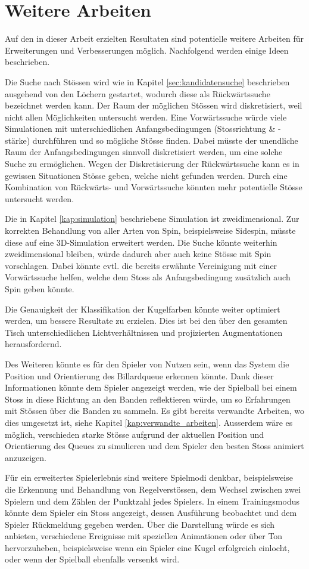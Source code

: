 \chapter{Weitere Arbeiten}
Auf den in dieser Arbeit erzielten Resultaten sind potentielle weitere Arbeiten für Erweiterungen und Verbesserungen
möglich.
Nachfolgend werden einige Ideen beschrieben.

Die Suche nach Stössen wird wie in Kapitel \ref{sec:kandidatensuche} beschrieben ausgehend von den Löchern gestartet,
wodurch diese als Rückwärtssuche bezeichnet werden kann.
Der Raum der möglichen Stössen wird diskretisiert, weil nicht allen Möglichkeiten untersucht werden.
Eine Vorwärtssuche würde viele Simulationen mit unterschiedlichen Anfangsbedingungen (Stossrichtung \& -stärke)
durchführen und so mögliche Stösse finden.
Dabei müsste der unendliche Raum der Anfangsbedingungen sinnvoll diskretisiert werden, um eine solche Suche zu ermöglichen.
Wegen der Diskretisierung der Rückwärtssuche kann es in gewissen Situationen Stösse geben, welche nicht gefunden werden.
Durch eine Kombination von Rückwärts- und Vorwärtssuche könnten mehr potentielle Stösse untersucht werden.

Die in Kapitel \ref{kap:simulation} beschriebene Simulation ist zweidimensional.
Zur korrekten Behandlung von aller Arten von Spin, beispielsweise Sidespin, müsste diese auf eine 3D-Simulation erweitert werden.
Die Suche könnte weiterhin zweidimensional bleiben, würde dadurch aber auch keine Stösse mit Spin vorschlagen.
Dabei könnte evtl. die bereits erwähnte Vereinigung mit einer Vorwärtssuche helfen, welche dem Stoss als
Anfangsbedingung zusätzlich auch Spin geben könnte.

Die Genauigkeit der Klassifikation der Kugelfarben könnte weiter optimiert werden, um bessere Resultate zu erzielen.
Dies ist bei den über den gesamten Tisch unterschiedlichen Lichtverhältnissen und projizierten Augmentationen herausfordernd.

Des Weiteren könnte es für den Spieler von Nutzen sein, wenn das System die Position und Orientierung des Billardqueue
erkennen könnte.
Dank dieser Informationen könnte dem Spieler angezeigt werden, wie der Spielball bei einem Stoss in diese Richtung
an den Banden reflektieren würde, um so Erfahrungen mit Stössen über die Banden zu sammeln.
Es gibt bereits verwandte Arbeiten, wo dies umgesetzt ist, siehe Kapitel \ref{kap:verwandte_arbeiten}.
Ausserdem wäre es möglich, verschieden starke Stösse aufgrund der aktuellen Position und Orientierung des Queues zu simulieren
und dem Spieler den besten Stoss animiert anzuzeigen.

Für ein erweitertes Spielerlebnis sind weitere Spielmodi denkbar, beispielsweise die Erkennung und Behandlung von
Regelverstössen, dem Wechsel zwischen zwei Spielern und dem Zählen der Punktzahl jedes Spielers.
In einem Trainingsmodus könnte dem Spieler ein Stoss angezeigt, dessen Ausführung beobachtet und dem Spieler
Rückmeldung gegeben werden.
Über die Darstellung würde es sich anbieten, verschiedene Ereignisse mit speziellen Animationen oder über Ton hervorzuheben,
beispielsweise wenn ein Spieler eine Kugel erfolgreich einlocht, oder wenn der Spielball ebenfalls versenkt wird.

